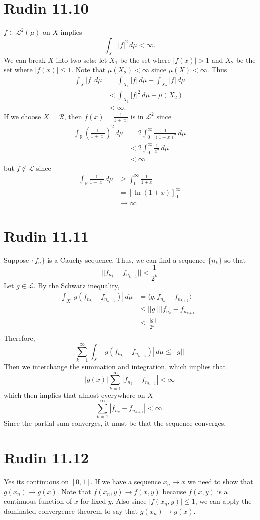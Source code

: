 \documentclass{article}
\begin{document}
\section*{Rudin 11.10}
$f \in \mathscr{L}^2(\mu)$ on $X$ implies 
\[
	\int_X |f|^2 \,d\mu < \infty.
\]
We can break $X$ into two sets:
let $X_1$ be the set where $|f(x)| > 1$ and 
$X_2$ be the set where $|f(x)| \leq 1$.
Note that $\mu(X_2) < \infty$ since $\mu(X) < \infty$.
Thus 
\begin{align*}
	\int_X |f| \,d\mu &= \int_{X_1} |f| \,d\mu + \int_{X_2} |f| \,d\mu \\
	&< \int_{X_1} |f|^2 \,d\mu  + \mu(X_2) \\
	&< \infty.
\end{align*}
If we choose $X = \mathcal{R}$, then $f(x) = \frac{1}{1+|x|}$ is in
$\mathscr{L}^2$ since
\begin{align*}
	\int_{\mathbb{R}} \left(\frac{1}{1+|x|}\right)^2 \,d\mu 
	&= 2\int_0^\infty \frac{1}{(1+x)^2} \,d\mu  \\
	&< 2\int_0^\infty \frac{1}{x^2} \,d\mu \\
	&<\infty 
\end{align*}
but $f \notin \mathscr{L}$ since
\begin{align*}
	\int_{\mathbb{R}} \frac{1}{1+|x|} \,d\mu &\geq \int_0^\infty \frac{1}{1+x} \\
	&= \left[\ln(1+x)\right]_0^\infty \\
	&\to \infty
\end{align*}

\newpage

\section*{Rudin 11.11}
Suppose $\{f_n\}$ is a Cauchy sequence.
Thus, we can find a sequence $\{n_k\}$ so that
\[
	||f_{n_k} - f_{n_{k+1}} || < \frac{1}{2^k}
\]
Let $g \in \mathscr{L}$. By the Schwarz inequality,
\begin{align*}
	\int_X |g(f_{n_k} - f_{n_{k+1}})| \,d\mu &= \langle g, f_{n_k} - f_{n_{k+1}}\rangle  \\
	&\leq ||g|| ||f_{n_k} - f_{n_{k+1}}|| \\
	&\leq \frac{||g||}{2^k} \\
\end{align*}
Therefore,
\[
	\sum_{k=1}^{\infty} \int_X |g(f_{n_k} - f_{n_{k+1}})| \,d\mu \leq ||g||
\]
Then we interchange the summation and integration, which implies that 
\[
	|g(x)| \sum_{k=1}^\infty |f_{n_k} - f_{n_{k+1}}| < \infty
\]
which then implies that almost everywhere on $X$
\[
	\sum_{k=1}^\infty |f_{n_k} - f_{n_{k+1}}| < \infty.
\]
Since the partial sum converges, it must be that the sequence converges.
\newpage

\section*{Rudin 11.12}
Yes its continuous on $[0,1]$. If we have a sequence $x_n \to x$ we need to show that $g(x_n) \to g(x)$.
Note that $f(x_n, y) \to f(x,y)$ because $f(x,y)$ is a continuous function of $x$ for fixed $y$.
Also since $|f(x_n, y)| \leq 1$, we can apply the dominated convergence theorem to say that
$g(x_n) \to g(x)$.
\newpage
\end{document}
